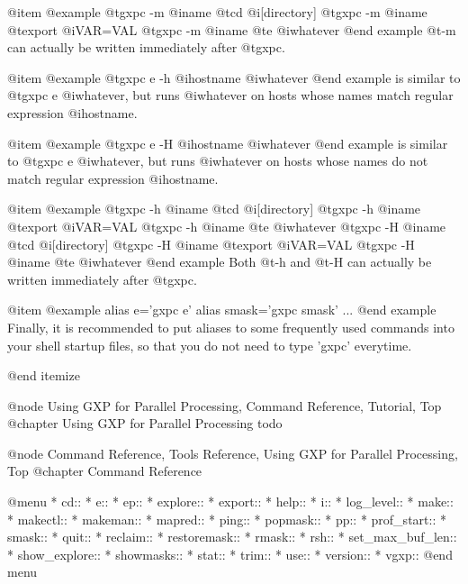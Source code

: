 @item 
@example
@t{gxpc -m} @i{name} @t{cd} @i{[directory]}
@t{gxpc -m} @i{name} @t{export} @i{VAR=VAL}
@t{gxpc -m} @i{name} @t{e} @i{whatever}
@end example
@t{-m} can actually be written immediately after @t{gxpc}.

@item 
@example
@t{gxpc e} -h @i{hostname} @i{whatever}
@end example
is similar to @t{gxpc e} @i{whatever}, but runs @i{whatever} on
hosts whose names match regular expression @i{hostname}. 

@item 
@example
@t{gxpc e} -H @i{hostname} @i{whatever}
@end example
is similar to @t{gxpc e} @i{whatever}, but runs @i{whatever} on
hosts whose names do not match regular expression @i{hostname}. 

@item 
@example
@t{gxpc -h} @i{name} @t{cd} @i{[directory]}
@t{gxpc -h} @i{name} @t{export} @i{VAR=VAL}
@t{gxpc -h} @i{name} @t{e} @i{whatever}
@t{gxpc -H} @i{name} @t{cd} @i{[directory]}
@t{gxpc -H} @i{name} @t{export} @i{VAR=VAL}
@t{gxpc -H} @i{name} @t{e} @i{whatever}
@end example
Both @t{-h} and @t{-H} can actually be written immediately after @t{gxpc}.

@item
@example
alias e='gxpc e'
alias smask='gxpc smask'
...
@end example
Finally, it is recommended to put aliases to some frequently used
commands into your shell startup files, so that you do not need to
type 'gxpc' everytime.


@end itemize




@node Using GXP for Parallel Processing, Command Reference, Tutorial, Top
@chapter Using GXP for Parallel Processing
todo

@node Command Reference, Tools Reference, Using GXP for Parallel Processing, Top
@chapter Command Reference

@menu
* cd::                          
* e::                           
* ep::                          
* explore::                     
* export::                      
* help::                        
* i::                           
* log_level::                   
* make::                        
* makectl::                     
* makeman::                     
* mapred::                      
* ping::                        
* popmask::                     
* pp::                          
* prof_start::                  
* smask::                       
* quit::                        
* reclaim::                     
* restoremask::                 
* rmask::                       
* rsh::                         
* set_max_buf_len::             
* show_explore::                
* showmasks::                   
* stat::                        
* trim::                        
* use::                         
* version::                     
* vgxp::                        
@end menu


